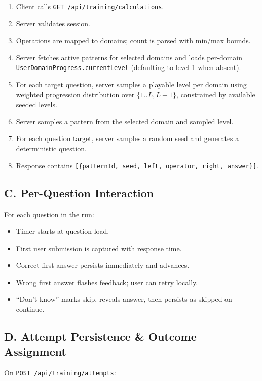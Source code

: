 \documentclass[11pt]{article}
\begin{document}
\begin{enumerate}[leftmargin=*]
	\item Client calls \texttt{GET /api/training/calculations}.
	\item Server validates session.
	\item Operations are mapped to domains; count is parsed with min/max bounds.
	\item Server fetches active patterns for selected domains and loads per-domain \texttt{UserDomainProgress.currentLevel} (defaulting to level 1 when absent).
	\item For each target question, server samples a playable level per domain using weighted progression distribution over \(\{1..L, L+1\}\), constrained by available seeded levels.
	\item Server samples a pattern from the selected domain and sampled level.
	\item For each question target, server samples a random seed and generates a deterministic question.
	\item Response contains \texttt{[\{patternId, seed, left, operator, right, answer\}]}.
\end{enumerate}

\subsection*{C. Per-Question Interaction}

For each question in the run:

\begin{itemize}[leftmargin=*]
	\item Timer starts at question load.
	\item First user submission is captured with response time.
	\item Correct first answer persists immediately and advances.
	\item Wrong first answer flashes feedback; user can retry locally.
	\item ``Don't know'' marks skip, reveals answer, then persists as skipped on continue.
\end{itemize}

\subsection*{D. Attempt Persistence \& Outcome Assignment}

On \texttt{POST /api/training/attempts}:
\end{document}
